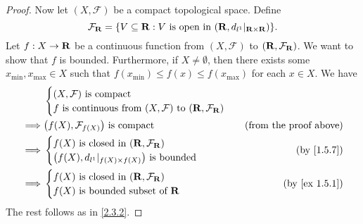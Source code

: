 \begin{proof}
  Now let \((X, \mathcal{F})\) be a compact topological space.
  Define
  \[
    \mathcal{F}_{\mathbf{R}} = \{V \subseteq \mathbf{R} : V \text{ is open in } (\mathbf{R}, d_{l^1}|_{\mathbf{R} \times \mathbf{R}})\}.
  \]
  Let \(f : X \to \mathbf{R}\) be a continuous function from \((X, \mathcal{F})\) to \((\mathbf{R}, \mathcal{F}_{\mathbf{R}})\).
  We want to show that \(f\) is bounded.
  Furthermore, if \(X \neq \emptyset\), then there exists some \(x_{\min}, x_{\max} \in X\) such that \(f(x_{\min}) \leq f(x) \leq f(x_{\max})\) for each \(x \in X\).
  We have
  \begin{align*}
             & \begin{cases}
                 (X, \mathcal{F}) \text{ is compact} \\
                 f \text{ is continuous from } (X, \mathcal{F}) \text{ to } (\R, \mathcal{F}_{\R})
               \end{cases}                                  \\
    \implies & \big(f(X), \mathcal{F}_{f(X)}\big) \text{ is compact}                             & \text{(from the proof above)} \\
    \implies & \begin{cases}
                 f(X) \text{ is closed in } (\R, \mathcal{F}_{\R}) \\
                 \big(f(X), d_{l^1}|_{f(X) \times f(X)}\big) \text{ is bounded}
               \end{cases}                    & \text{(by \cref{1.5.7})}                                                     \\
    \implies & \begin{cases}
                 f(X) \text{ is closed in } (\R, \mathcal{F}_{\R}) \\
                 f(X) \text{ is bounded subset of } \R
               \end{cases}                              & \text{(by \cref{ex 1.5.1})}
  \end{align*}
  The rest follows as in \cref{2.3.2}.
\end{proof}